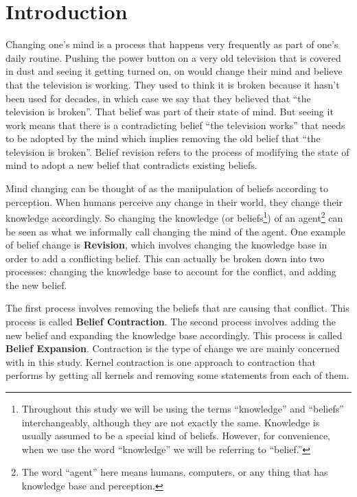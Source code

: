 \chapter{Introduction}

Changing one's mind is a process that happens very frequently as part of one's daily routine. Pushing the power button on a very old television that is covered in dust and seeing it getting turned on, on would change their mind and believe that the television is working. They used to think it is broken because it hasn't been used for decades, in which case we say that they believed that ``the television is broken''. That belief was part of their state of mind. But seeing it work means that there is a contradicting belief ``the television works'' that needs to be adopted by the mind which implies removing the old belief that ``the television is broken''. Belief revision refers to the process of modifying the state of mind to adopt a new belief that contradicts existing beliefs.

Mind changing can be thought of as the manipulation of beliefs according to perception. When humans perceive any change in their world, they change their knowledge accordingly. So changing the knowledge (or beliefs\footnote{Throughout this study we will be using the terms ``knowledge'' and ``beliefs'' interchangeably, although they are not exactly the same. Knowledge is usually assumed to be a special kind of beliefs. However, for convenience, when we use the word ``knowledge'' we will be referring to ``belief.'' }) of an agent\footnote{The word ``agent'' here means humans, computers, or any thing that has knowledge base and perception.} can be seen as what we informally call changing the mind of the agent. One example of belief change is \textbf{Revision}, which involves changing the knowledge base in order to add a conflicting belief. This can actually be broken down into two processes: changing the knowledge base to account for the conflict, and adding the new belief. 

The first process involves removing the beliefs that are causing that conflict. This process is called \textbf{Belief Contraction}. The second process involves adding the new belief and expanding the knowledge base accordingly. This process is called \textbf{Belief Expansion}. Contraction is the type of change we are mainly concerned with in this study. Kernel contraction is one approach to contraction that performs by getting all kernels and removing some statements from each of them. 


